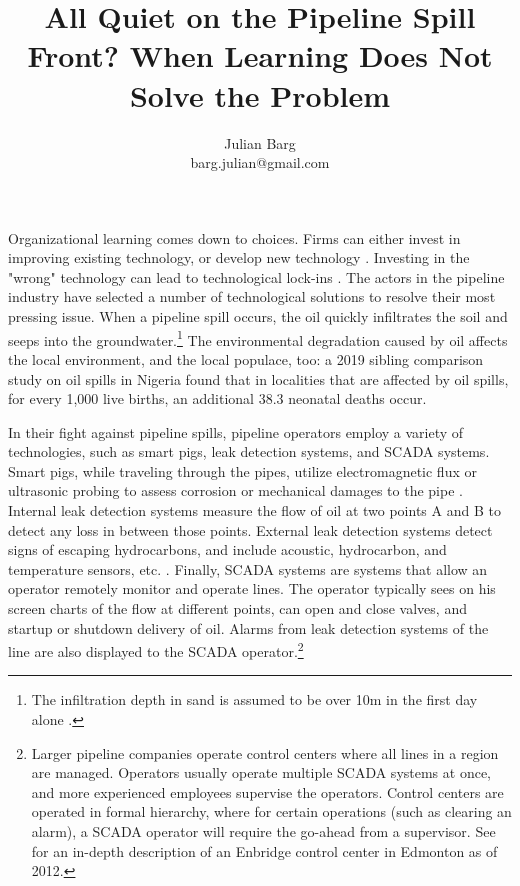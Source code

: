 \documentclass[12pt, man, natbib]{apa6}
\title{All Quiet on the Pipeline Spill Front? When Learning Does Not Solve the Problem}
\author{Julian Barg\\barg.julian@gmail.com}
\affiliation{Ivey Business School}
\begin{document}
	
	\maketitle
	
	\singlespacing
	
	\section{}
	
	Organizational learning comes down to choices. Firms can either invest in improving existing technology, or develop new technology \citep{March1991}. Investing in the "wrong" technology can lead to technological lock-ins \citep{Levinthal1993}. The actors in the pipeline industry have selected a number of technological solutions to resolve their most pressing issue. When a pipeline spill occurs, the oil quickly infiltrates the soil and seeps into the groundwater.\footnote{The infiltration depth in sand is assumed to be over 10m in the first day alone \citep{Bonvicini2015}.} The environmental degradation caused by oil affects the local environment, and the local populace, too: a 2019 sibling comparison study on oil spills in Nigeria found that in localities that are affected by oil spills, for every 1,000 live births, an additional 38.3 neonatal deaths occur\citep{Bruederle2019}. %
	
	In their fight against pipeline spills, pipeline operators employ a variety of technologies, such as smart pigs, leak detection systems, and SCADA systems. Smart pigs, while traveling through the pipes, utilize electromagnetic flux or ultrasonic probing to assess corrosion or mechanical damages to the pipe \citep{Singh2017-7}. Internal leak detection systems measure the flow of oil at two points A and B to detect any loss in between those points. External leak detection systems detect signs of escaping hydrocarbons, and include acoustic, hydrocarbon, and temperature sensors, etc. \citep{Shaw2012}. Finally, SCADA systems are systems that allow an operator remotely monitor and operate lines. The operator typically sees on his screen charts of the flow at different points, can open and close valves, and startup or shutdown delivery of oil. Alarms from leak detection systems of the line are also displayed to the SCADA operator.\footnote{Larger pipeline companies operate control centers where all lines in a region are managed. Operators usually operate multiple SCADA systems at once, and more experienced employees supervise the operators. Control centers are operated in formal hierarchy, where for certain operations (such as clearing an alarm), a SCADA operator will require the go-ahead from a supervisor. See \citet{NTSB2012} for an in-depth description of an Enbridge control center in Edmonton as of 2012.}
\end{document}
